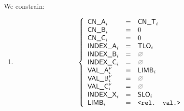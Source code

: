 \begin{center}
\end{center}

We constrain:
\begin{enumerate}
	\item 
\[
	\left\{
	\begin{array}{lclr}
		\cnA      _{i}       & = & \cnT_{i}           \\
		\cnB      _{i}       & = & 0                  \\
		\cnC      _{i}       & = & 0                  \\
		\indexA   _{i}       & = & \tlo_{i}           \\
		\indexB   _{i}       & = & \nothing           \\
		\indexC   _{i}       & = & \nothing           \\
		\valA     _{i}\new{} & = & \limb_{i}          \\
		\valB     _{i}\new{} & = & \nothing           \\
		\valC     _{i}\new{} & = & \nothing           \\
		\indexX   _{i}       & = & \slo_{i}           \\
		\limb     _{i}       & = & \relevantValue     \\
	\end{array}
	\right.
\]
\end{enumerate}
